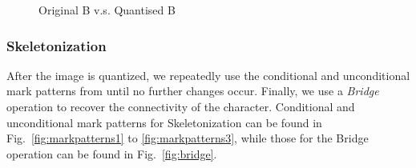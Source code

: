 \documentclass{article}
\begin{document}
\begin{figure}
\caption{Original B v.s. Quantised B}
\end{figure}

\subsubsection{Skeletonization}
After the image is quantized, we repeatedly use the conditional and unconditional mark patterns from \cite{Pratt:2001:DIP:516234} until no further changes occur. Finally, we use a \textit{Bridge} operation to recover the connectivity of the character. Conditional and unconditional mark patterns for Skeletonization can be found in Fig.~\ref{fig:markpatterns1} to \ref{fig:markpatterns3}, while those for the Bridge operation can be found in Fig.~\ref{fig:bridge}.
\end{document}

